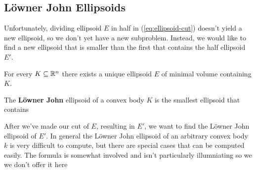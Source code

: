 \subsection{L\"owner John Ellipsoids}
Unfortunately, dividing ellipsoid \(E\) in half in (\ref{eq:ellipsoid-cut})
doesn't yield a new ellipsoid, so we don't yet have a new subproblem. Instead,
we would like to find a new ellipsoid that is smaller than the first that
contains the half ellipsoid \(E'\). 

\begin{theorem} For every \(K \subseteq \mathbb R^n\) there exists a unique ellipsoid
\(E\) of minimal volume containing \(K\).
\end{theorem}


\begin{defbox}
\begin{definition}
The \textbf{L\"owner John} ellipsoid of a convex body \(K\) is the smallest
ellipsoid that contains 
\end{definition}


\end{defbox}

After we've made our cut of \(E\), resulting in \(E'\), we want to find the
L\"owner John ellipsoid of \(E'\). In general the L\"owner John ellipsoid of an
arbitrary convex body \(k\) is very difficult to compute, but there are special
cases that can be computed easily. The formula is somewhat involved and isn't
particularly illumniating so we we don't offer it here 

